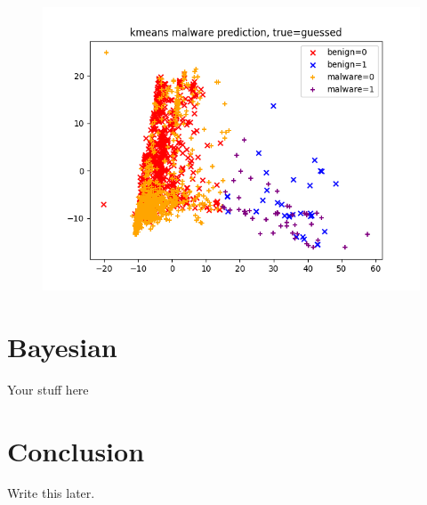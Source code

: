 \documentclass[12pt]{article}
\begin{document}
\begin{figure}[H]
\centering
\includegraphics[width=.5\textheight]{kmeans_guesses}
\end{figure}
\section{Bayesian}
\par
Your stuff here
\section{Conclusion}
\par
Write this later.
\end{document}
